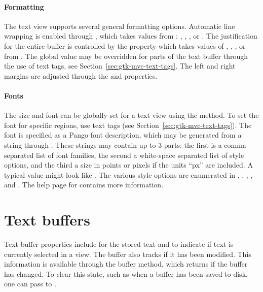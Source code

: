 \paragraph{Formatting}
The text view supports several general formatting options. Automatic
line wrapping is enabled through ,
which takes values from : ,
, , or . The justification
for the entire buffer is controlled by the 
property which takes values of , ,
, or  from .  The
global value may be overridden for parts of the text buffer through
the use of text tags, see Section~\ref{sec:gtk-mvc-text-tags}. The
left and right margins are adjusted through the  and
 properties.

\paragraph{Fonts}
The size and font can be globally set for a text view using the
 method. To set the font for specific
regions, use text tags (see Section~\ref{sec:gtk-mvc-text-tags}). The
font is specified as a Pango font description, which may be generated
from a string through . These
strings may contain up to 3 parts: the first is a comma-separated list
of font families, the second a white-space separated list of style
options, and the third a size in points or pixels if the units ``px''
are included. A typical value might look like . The various style options are enumerated
in , , ,
, and . The help page for
 contains more information.


\section{Text buffers}
\label{sec:RGtk2:text-buffers}

Text buffer properties include  for the stored text and
 to indicate if text is currently selected in a
view. The buffer also tracks if it has been modified. This information
is available through the buffer 
method, which returns  if the buffer has changed. To clear
this state, such as when a buffer has been saved to disk, one can pass
 to .

